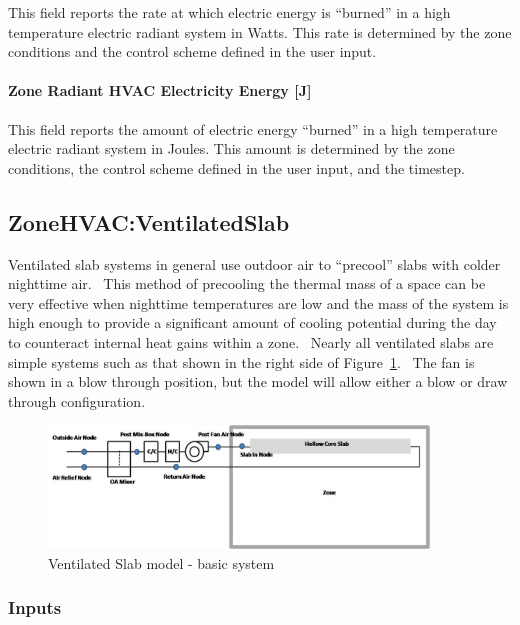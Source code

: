 This field reports the rate at which electric energy is ``burned'' in a high temperature electric radiant system in Watts. This rate is determined by the zone conditions and the control scheme defined in the user input.

\paragraph{Zone Radiant HVAC Electricity Energy {[}J{]}}\label{zone-radiant-hvac-electric-energy-j-1}

This field reports the amount of electric energy ``burned'' in a high temperature electric radiant system in Joules. This amount is determined by the zone conditions, the control scheme defined in the user input, and the timestep.

\subsection{ZoneHVAC:VentilatedSlab}\label{zonehvacventilatedslab}

Ventilated slab systems in general use outdoor air to ``precool'' slabs with colder nighttime air.~ This method of precooling the thermal mass of a space can be very effective when nighttime temperatures are low and the mass of the system is high enough to provide a significant amount of cooling potential during the day to counteract internal heat gains within a zone.~ Nearly all ventilated slabs are simple systems such as that shown in the right side of Figure~\ref{fig:ventilated-slab-model-basic-system}.~ The fan is shown in a blow through position, but the model will allow either a blow or draw through configuration.

\begin{figure}[hbtp] %
\centering
\includegraphics[width=0.9\textwidth, height=0.9\textheight, keepaspectratio=true]{media/image321.png}
\caption{Ventilated Slab model - basic system \protect \label{fig:ventilated-slab-model-basic-system}}
\end{figure}

\subsubsection{Inputs}\label{inputs-10-014}

